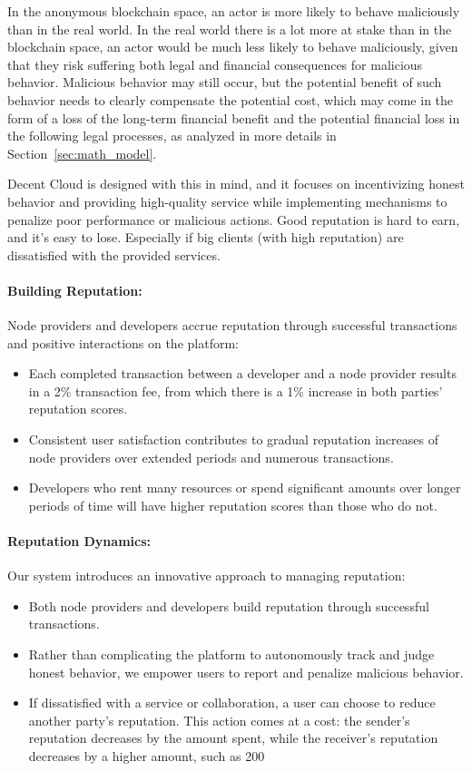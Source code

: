 In the anonymous blockchain space, an actor is more likely to behave maliciously than in the real world. In the real world there is a lot more at stake than in the blockchain space, an actor would be much less likely to behave maliciously, given that they risk suffering both legal and financial consequences for malicious behavior. Malicious behavior may still occur, but the potential benefit of such behavior needs to clearly compensate the potential cost, which may come in the form of a loss of the long-term financial benefit and the potential financial loss in the following legal processes, as analyzed in more details in Section~\ref{sec:math_model}.

Decent Cloud is designed with this in mind, and it focuses on incentivizing honest behavior and providing  high-quality service while implementing mechanisms to penalize poor performance or malicious actions. Good reputation is hard to earn, and it's easy to lose. Especially if big clients (with high reputation) are dissatisfied with the provided services.

\paragraph{Building Reputation:}
Node providers and developers accrue reputation through successful transactions and positive interactions on the platform:

\begin{itemize}
    \item Each completed transaction between a developer and a node provider results in a 2\% transaction fee, from which there is a 1\% increase in both parties' reputation scores.
    \item Consistent user satisfaction contributes to gradual reputation increases of node providers over extended periods and numerous transactions.
    \item Developers who rent many resources or spend significant amounts over longer periods of time will have higher reputation scores than those who do not.
\end{itemize}

\paragraph{Reputation Dynamics:}
Our system introduces an innovative approach to managing reputation:

\begin{itemize}
    \item Both node providers and developers build reputation through successful transactions.
    \item Rather than complicating the platform to autonomously track and judge honest behavior, we empower users to report and penalize malicious behavior.
    \item If dissatisfied with a service or collaboration, a user can choose to reduce another party's reputation. This action comes at a cost: the sender's reputation decreases by the amount spent, while the receiver's reputation decreases by a higher amount, such as 200%
\end{itemize}

